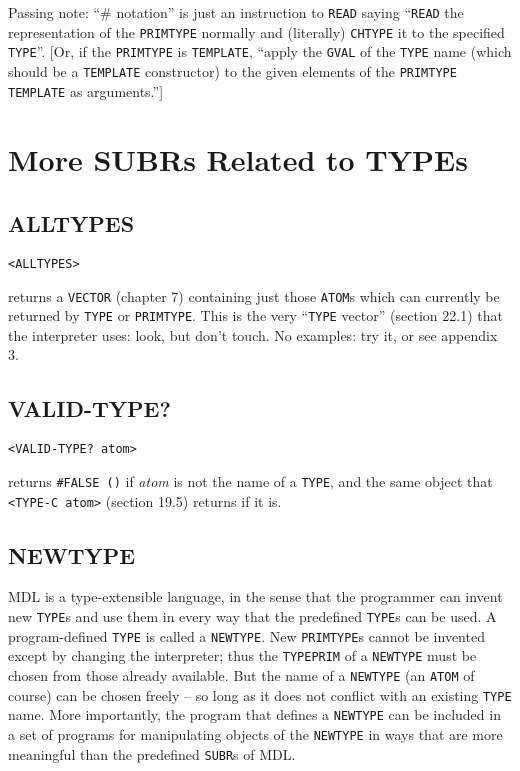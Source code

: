 \documentclass[a4paper]{scrbook}
\begin{document}
Passing note: ``\# notation'' \index{\texttt{\#}} is just an instruction to \texttt{READ} saying ``\texttt{READ} the
representation of the \texttt{PRIMTYPE} normally and (literally) \texttt{CHTYPE} it to the specified \texttt{TYPE}''.
{[}Or, if the \texttt{PRIMTYPE} is \texttt{TEMPLATE}, ``apply the \texttt{GVAL} of the \texttt{TYPE} name (which should be
a \texttt{TEMPLATE} constructor) to the given elements of the \texttt{PRIMTYPE} \texttt{TEMPLATE} as arguments.''{]}

\section{More SUBRs Related to TYPEs}\label{more-subrs-related-to-types}

\subsection{ALLTYPES}\label{alltypes}

\begin{verbatim}
<ALLTYPES>
\end{verbatim}

 returns a \texttt{VECTOR} (chapter 7) containing just those \texttt{ATOM}s which can
currently be returned by \texttt{TYPE} or \texttt{PRIMTYPE}. This is the very ``\texttt{TYPE} vector'' (section 22.1) that
the interpreter uses: look, but don't touch. No examples: try it, or see appendix 3.

\subsection{VALID-TYPE?}\label{valid-type}

\begin{verbatim}
<VALID-TYPE? atom>
\end{verbatim}

 returns \texttt{\#FALSE\ ()} if \emph{atom} is not the name of a \texttt{TYPE}, and the
same object that \texttt{\textless{}TYPE-C\ atom\textgreater{}} (section 19.5) returns if it is.

\subsection{NEWTYPE}\label{newtype}

MDL is a type-extensible language, in the sense that the programmer can invent new \texttt{TYPE}s and use them in every way
that the predefined \texttt{TYPE}s can be used. A program-defined \texttt{TYPE} is called a
\texttt{NEWTYPE}. New \texttt{PRIMTYPE}s cannot be invented except by changing the
interpreter; thus the \texttt{TYPEPRIM} of a \texttt{NEWTYPE} must be chosen from those already available. But the name of
a \texttt{NEWTYPE} (an \texttt{ATOM} of course) can be chosen freely -- so long as it does not conflict with an existing
\texttt{TYPE} name. More importantly, the program that defines a \texttt{NEWTYPE} can be included in a set of programs for
manipulating objects of the \texttt{NEWTYPE} in ways that are more meaningful than the predefined \texttt{SUBR}s of MDL.
\end{document}
